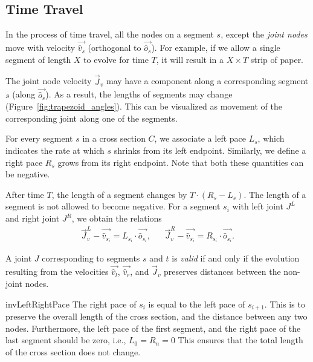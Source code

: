 \subsection{Time Travel}
\label{sec:time_travel}

In the process of time travel, all the nodes on a segment $s$, except the
\emph{joint nodes} move with velocity $\vec{\hat v_s}$ (orthogonal to $\vec{\hat
o_s}$). For example, if we allow a single segment of length $X$ to evolve for
time $T$, it will result in a $X\times T$ strip of paper.

The joint node velocity $\vec J_v$ may have a component along a corresponding
segment $s$ (along $\vec{\hat o_s}$). As a result, the lengths of segments may
change (Figure~\ref{fig:trapezoid_angles}). This can be visualized as movement
of the corresponding joint along one of the segments.

\begin{definition}
\label{def:segment_length}
For every segment $s$ in a cross section $C$, we associate a left pace $L_s$,
which indicates the rate at which $s$ shrinks from its left endpoint.
Similarly, we define a right pace $R_s$ grows from its right endpoint.
Note that both these quantities can be negative.
\end{definition}
After time $T$, the length of a segment changes by $T\cdot(R_s-L_s)$.
The length of a segment is not allowed to become negative.
For a segment $s_i$ with left joint $J^L$ and right joint $J^R$, we obtain the relations
\begin{align*}
\vec J_v^L-\vec{\hat v_{s_i}} = L_{s_i}\cdot \vec{\hat o_{s_i}}, && \vec J_v^R-\vec{\hat v_{s_i}} = R_{s_i}\cdot \vec{\hat o_{s_i}}.
\end{align*}

\begin{definition}
\label{def:valid_joint}
A joint $J$ corresponding to segments $s$ and $t$ is \emph{valid} if and only if the evolution
resulting from the velocities $\vec{\hat v_l}$, $\vec{\hat v_r}$, and $\vec J_v$ preserves distances between the non-joint nodes.
\end{definition}
\vspace{-1pc}
\begin{restatable}{inv}{LeftRightPace}
\label{inv:left_right_pace}
The right pace of $s_{i}$ is equal to the left pace of $s_{i+1}$.
This is to preserve the overall length of the cross section, and the distance between any two nodes.
Furthermore, the left pace of the first segment, and the right pace of the last segment should be zero, i.e., $L_0 = R_n = 0$
This ensures that the total length of the cross section does not change.
\end{restatable}

